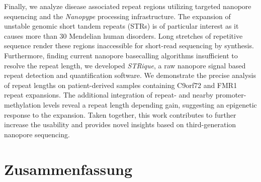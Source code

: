 Finally, we analyze disease associated repeat regions utilizing targeted nanopore sequencing and the \textit{Nanopype} processing infrastructure.
The expansion of unstable genomic short tandem repeats (STRs) is of particular interest as it causes more than 30 Mendelian human disorders.
Long stretches of repetitive sequence render these regions inaccessible for short-read sequencing by synthesis.
Furthermore, finding current nanopore basecalling algorithms insufficient to resolve the repeat length, we developed \textit{STRique}, a raw nanopore signal based repeat detection and quantification software.
We demonstrate the precise analysis of repeat lengths on patient-derived samples containing C9orf72 and FMR1 repeat expansions. 
The additional integration of repeat- and nearby promoter-methylation levels reveal a repeat length depending gain, suggesting an epigenetic response to the expansion.
Taken together, this work contributes to further increase the usability and provides novel insights based on third-generation nanopore sequencing.




\cleardoublepage
\vspace*{10mm}
\section*{Zusammenfassung}
\label{sec:zusammenfassung}

